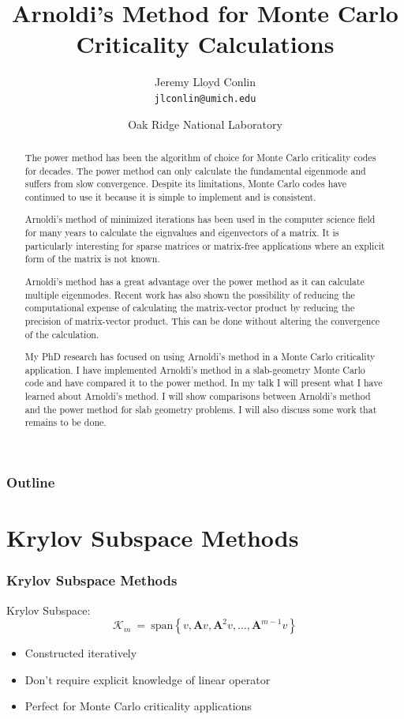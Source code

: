\documentclass[color={usenames, dvipsnames},ignorenonframetext]{beamer}
\author[JLC]{Jeremy Lloyd Conlin \\ \texttt{jlconlin@umich.edu}}
\institute[UM]{University of Michigan, Ann Arbor, Michigan}
\title[Monte Carlo Arnoldi]{Arnoldi's Method for Monte Carlo Criticality Calculations}
\date[ORNL]{Oak Ridge National Laboratory}
\newcommand{\A}{\mathbf{A}}
\begin{document}
\begin{abstract}
    The power method has been the algorithm of choice for Monte Carlo criticality codes for decades.  The power method can only calculate the fundamental eigenmode and suffers from slow convergence.  Despite its limitations, Monte Carlo codes have continued to use it because it is simple to implement and is consistent.

    Arnoldi's method of minimized iterations has been used in the computer science field for many years to calculate the eignvalues and eigenvectors of a matrix.  It is particularly interesting for sparse matrices or matrix-free applications where an explicit form of the matrix is not known.  

    Arnoldi's method has a great advantage over the power method as it can calculate multiple eigenmodes.  Recent work has also shown the possibility of reducing the computational expense of calculating the matrix-vector product by reducing the precision of matrix-vector product.  This can be done without altering the convergence of the calculation.  

    My PhD research has focused on using Arnoldi's method in a Monte Carlo criticality application.  I have implemented Arnoldi's method in a slab-geometry Monte Carlo code and have compared it to the power method.  In my talk I will present what I have learned about Arnoldi's method.  I will show comparisons between Arnoldi's method and the power method for slab geometry problems.  I will also discuss some work that remains to be done.
\end{abstract}

\begin{frame} 
    \titlepage 
\end{frame}

\begin{frame}
    \frametitle{Outline}
    \tableofcontents[pausesection]
\end{frame}

\section{Krylov Subspace Methods}
\begin{frame}
    \frametitle{Krylov Subspace Methods}
    Krylov Subspace:
    \begin{equation*}
        \mathcal{K}_m~=~\mathrm{span}\left\{v, \A v, \A^2v, \ldots , \A^{m-1}v\right\}
    \end{equation*}
    \begin{itemize}
        \item Constructed iteratively
        \item Don't require explicit knowledge of linear operator
        \item Perfect for Monte Carlo criticality applications
    \end{itemize}
\end{frame}
\end{document}
